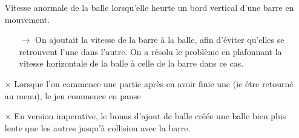 \begin{enumerate}
      \item[\checkmark] Vitesse anormale de la balle lorsqu'elle heurte un bord vertical d'une barre en mouvement.
      \begin{itemize}
        \item[$\rightarrow$] On ajoutait la vitesse de la barre à la balle, afin d'éviter qu'elles se retrouvent l'une dans l'autre. On a résolu le problème en plafonnant la vitesse horizontale de la balle à celle de la barre dans ce cas.
      \end{itemize}
      \item[\bf $\times$] Lorsque l'on commence une partie après en avoir finie une (ie être retourné au menu), le jeu commence en pause
      \item[\bf $\times$] En version imperative, le bonus d'ajout de balle créée une balle bien plus lente que les autres jusqu'à collision avec la barre.
    \end{enumerate}
  
